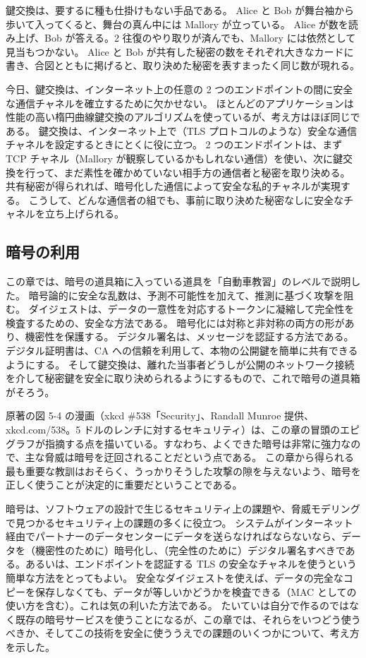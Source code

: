 \documentclass[uplatex]{jsarticle}
\begin{document}
鍵交換は、要するに種も仕掛けもない手品である。
Alice と Bob が舞台袖から歩いて入ってくると、舞台の真ん中には Mallory が立っている。
Alice が数を読み上げ、Bob が答える。2 往復のやり取りが済んでも、Mallory には依然として見当もつかない。
Alice と Bob が共有した秘密の数をそれぞれ大きなカードに書き、合図とともに掲げると、取り決めた秘密を表すまったく同じ数が現れる。

今日、鍵交換は、インターネット上の任意の 2 つのエンドポイントの間に安全な通信チャネルを確立するために欠かせない。
ほとんどのアプリケーションは性能の高い楕円曲線鍵交換のアルゴリズムを使っているが、考え方はほぼ同じである。
鍵交換は、インターネット上で（TLS プロトコルのような）安全な通信チャネルを設定するときにとくに役に立つ。
2 つのエンドポイントは、まず TCP チャネル（Mallory が観察しているかもしれない通信）を使い、次に鍵交換を行って、まだ素性を確かめていない相手方の通信者と秘密を取り決める。
共有秘密が得られれば、暗号化した通信によって安全な私的チャネルが実現する。
こうして、どんな通信者の組でも、事前に取り決めた秘密なしに安全なチャネルを立ち上げられる。

\subsection{暗号の利用}

この章では、暗号の道具箱に入っている道具を「自動車教習」のレベルで説明した。
暗号論的に安全な乱数は、予測不可能性を加えて、推測に基づく攻撃を阻む。
ダイジェストは、データの一意性を対応するトークンに凝縮して完全性を検査するための、安全な方法である。
暗号化には対称と非対称の両方の形があり、機密性を保護する。
デジタル署名は、メッセージを認証する方法である。
デジタル証明書は、CA への信頼を利用して、本物の公開鍵を簡単に共有できるようにする。
そして鍵交換は、離れた当事者どうしが公開のネットワーク接続を介して秘密鍵を安全に取り決められるようにするもので、これで暗号の道具箱がそろう。

原著の図 5-4 の漫画（xkcd \#538「Security」、Randall Munroe 提供、xkcd.com/538。5 ドルのレンチに対するセキュリティ）は、この章の冒頭のエピグラフが指摘する点を描いている。すなわち、よくできた暗号は非常に強力なので、主な脅威は暗号を迂回されることだという点である。
この章から得られる最も重要な教訓はおそらく、うっかりそうした攻撃の隙を与えないよう、暗号を正しく使うことが決定的に重要だということである。

暗号は、ソフトウェアの設計で生じるセキュリティ上の課題や、脅威モデリングで見つかるセキュリティ上の課題の多くに役立つ。
システムがインターネット経由でパートナーのデータセンターにデータを送らなければならないなら、データを（機密性のために）暗号化し、（完全性のために）デジタル署名すべきである。あるいは、エンドポイントを認証する TLS の安全なチャネルを使うという簡単な方法をとってもよい。
安全なダイジェストを使えば、データの完全なコピーを保存しなくても、データが等しいかどうかを検査できる（MAC としての使い方を含む）。これは気の利いた方法である。
たいていは自分で作るのではなく既存の暗号サービスを使うことになるが、この章では、それらをいつどう使うべきか、そしてこの技術を安全に使ううえでの課題のいくつかについて、考え方を示した。
\end{document}
